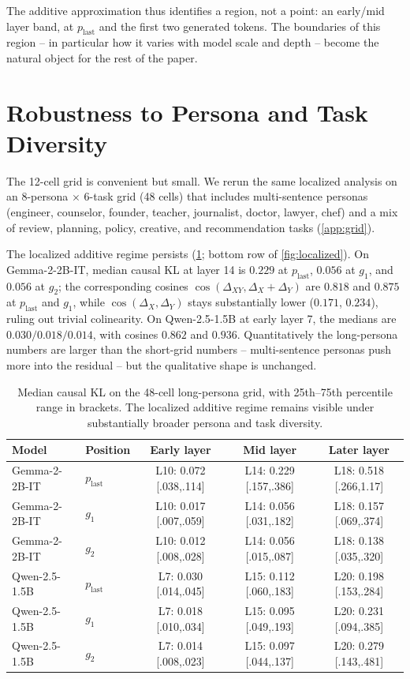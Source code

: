 \documentclass[11pt]{article}
\begin{document}
The additive approximation thus identifies a region, not a point: an early/mid layer band, at $p_{\text{last}}$ and the first two generated tokens. The boundaries of this region -- in particular how it varies with model scale and depth -- become the natural object for the rest of the paper.

\section{Robustness to Persona and Task Diversity}
\label{sec:diverse}

The 12-cell grid is convenient but small. We rerun the same localized analysis on an 8-persona $\times$ 6-task grid (48 cells) that includes multi-sentence personas (engineer, counselor, founder, teacher, journalist, doctor, lawyer, chef) and a mix of review, planning, policy, creative, and recommendation tasks (\cref{app:grid}).

The localized additive regime persists (\cref{tab:localized-diverse}; bottom row of \cref{fig:localized}). On Gemma-2-2B-IT, median causal KL at layer 14 is $0.229$ at $p_{\text{last}}$, $0.056$ at $g_1$, and $0.056$ at $g_2$; the corresponding cosines $\cos(\Delta_{XY}, \Delta_X + \Delta_Y)$ are $0.818$ and $0.875$ at $p_{\text{last}}$ and $g_1$, while $\cos(\Delta_X, \Delta_Y)$ stays substantially lower ($0.171$, $0.234$), ruling out trivial colinearity. On Qwen-2.5-1.5B at early layer 7, the medians are $0.030 / 0.018 / 0.014$, with cosines $0.862$ and $0.936$. Quantitatively the long-persona numbers are larger than the short-grid numbers -- multi-sentence personas push more into the residual -- but the qualitative shape is unchanged.

\begin{table}[t]
\centering
\small
\begin{tabular}{llccc}
\toprule
Model & Position & Early layer & Mid layer & Later layer \\
\midrule
Gemma-2-2B-IT & $p_{\text{last}}$ & L10: 0.072 [.038,.114] & L14: 0.229 [.157,.386] & L18: 0.518 [.266,1.17] \\
Gemma-2-2B-IT & $g_1$             & L10: 0.017 [.007,.059] & L14: 0.056 [.031,.182] & L18: 0.157 [.069,.374] \\
Gemma-2-2B-IT & $g_2$             & L10: 0.012 [.008,.028] & L14: 0.056 [.015,.087] & L18: 0.138 [.035,.320] \\
\midrule
Qwen-2.5-1.5B & $p_{\text{last}}$ & L7: 0.030 [.014,.045] & L15: 0.112 [.060,.183] & L20: 0.198 [.153,.284] \\
Qwen-2.5-1.5B & $g_1$             & L7: 0.018 [.010,.034] & L15: 0.095 [.049,.193] & L20: 0.231 [.094,.385] \\
Qwen-2.5-1.5B & $g_2$             & L7: 0.014 [.008,.023] & L15: 0.097 [.044,.137] & L20: 0.279 [.143,.481] \\
\bottomrule
\end{tabular}
\caption{Median causal KL on the 48-cell long-persona grid, with 25th--75th percentile range in brackets. The localized additive regime remains visible under substantially broader persona and task diversity.}
\label{tab:localized-diverse}
\end{table}
\end{document}

